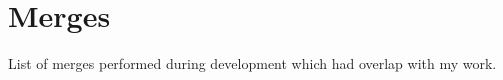 \chapter{Merges}
\label{sec:Merges}
List of merges performed during development which had overlap with my work.